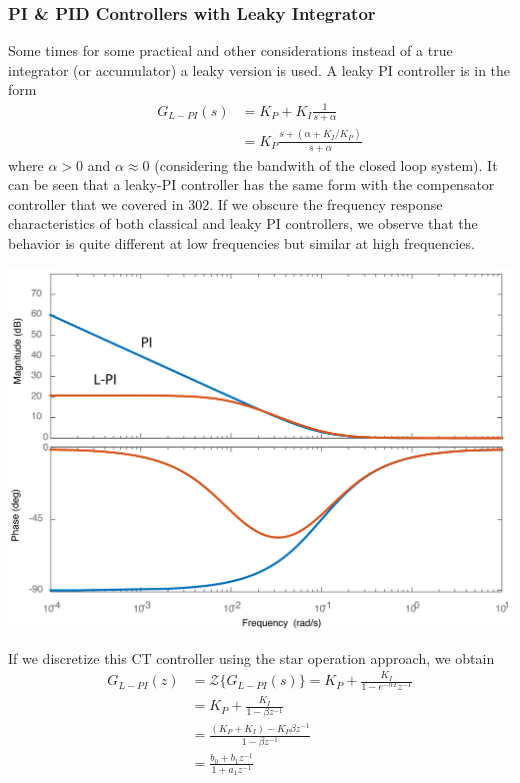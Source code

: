 \documentclass[twoside]{article}
\begin{document}
\subsubsection*{PI \& PID Controllers with Leaky Integrator}
%
Some times for some practical and other considerations
instead of a true integrator (or accumulator) a leaky version 
is used. A leaky PI controller is in the form
%
\begin{align*}
  G_{L-PI}(s) &= K_P + K_I \frac{1}{s + \alpha} \\
  &= K_P \frac{s + ( \alpha + K_I / K_P) }{s + \alpha}
\end{align*}
%
where $\alpha > 0$ and $\alpha \approx 0$ (considering the bandwith 
of the closed loop system). It can be seen that a leaky-PI controller
has the same form with the compensator controller that we covered in 
302. If we obscure the frequency response characteristics of both
classical and leaky PI controllers, we observe that the behavior is
quite different at low frequencies but similar at high frequencies.
%
    \begin{center}
\begin{minipage}[h]{0.6\linewidth}
    \begin{center}
      \includegraphics[width=\textwidth]{PI}
    \end{center}
\end{minipage}
    \end{center}
%
If we discretize this CT controller
using the star operation approach, we obtain
%
\begin{align*}
  G_{L-PI}(z) &= \mathcal{Z} \lbrace G_{L-PI}(s) \rbrace  = K_P + 
  \frac{K_I}{1 - e^{-\alpha T} z^{-1}} \\
  &= K_P  + \frac{K_I}{1 - \beta z^{-1}} 
  \\
  &= \frac{(K_P  + K_I) - K_P \beta z^{-1} }{1 - \beta z^{-1}} 
  \\
 &= \frac{ b_0 + b_1 z^{-1}}{1 + a_1 z^{-1}} 
\end{align*}
\end{document}
